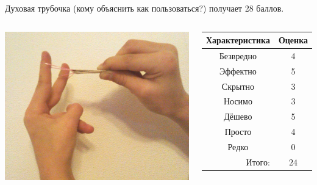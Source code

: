 Духовая трубочка (кому объяснить как пользоваться?) получает 28 баллов.

\begin{frame} %
    \begin{columns}
            \begin{center}
                \includegraphics[width=\textwidth]{fig/slingshot}
            \end{center}
            
            \begin{center}
                \begin{tabular}{c|c}
                    \hline\hline
                    Характеристика              & Оценка\\ \hline\hline
                    Безвредно                   & 4 \\
                    Эффектно                    & 5 \\
                    Скрытно                     & 3 \\
                    Носимо                      & 3 \\
                    Дёшево                      & 5 \\
                    Просто                      & 4 \\ 
                    Редко                       & 0 \\ \hline
                    \multicolumn{1}{r|}{Итого:} & $24$ \\
                \end{tabular}
            \end{center}
    \end{columns}    
\end{frame}

